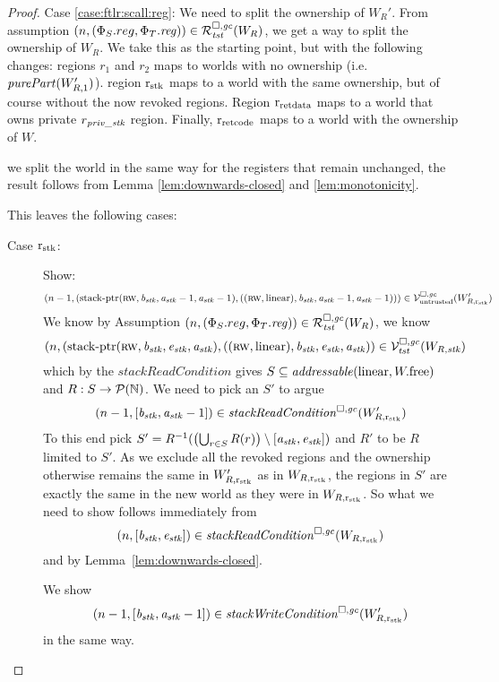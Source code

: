 \begin{proof}
  Case \ref{case:ftlr:scall:reg}: We need to split the ownership of $W_R'$.
  From assumption $\npair[n]{(\Phi_S.reg,\Phi_T.\reg)} \in \lrrg{\trust}(W_R)$, we get a way to split the ownership of $W_R$.
  We take this as the starting point, but with the following changes: regions $r_1$ and $r_2$ maps to worlds with no ownership (i.e.\ $\purePart{W_{R,1}'}$).
  region $\rstk$ maps to a world with the same ownership, but of course without the now revoked regions.
  Region $\rretd$ maps to a world that owns private $r_\var{priv\_stk}$ region.
  Finally, $\rretc$ maps to a world with the ownership of $W$.

  we split the world in the same way for the registers that remain unchanged, the
  result follows from Lemma \ref{lem:downwards-closed} and \ref{lem:monotonicity}.

  This leaves the following cases:
  \begin{description}
  \item[Case $\rstk$:] Show:
    \[
      \npair[n-1]{(\stkptr{\rw,\baddr_\stk,\aaddr_\stk-1,\aaddr_\stk-1},((\rw,\linear),\baddr_\stk,\aaddr_\stk-1,\aaddr_\stk-1))} \in \lrv(W_{R,\rstk}')
    \]
    We know by Assumption $\npair[n]{(\Phi_S.reg,\Phi_T.\reg)} \in \lrrg{\trust}(W_R)$, we know
    \[
      \npair[n]{(\stkptr{\rw,\baddr_\stk,\eaddr_\stk,\aaddr_\stk},((\rw, \linear), \baddr_\stk ,\eaddr_\stk, \aaddr_\stk)} \in \lrvg{\trust}(W_{R,\stk})
    \]
    which by the $\mathit{stackReadCondition}$ gives $S \subseteq \addressable{\linear,\pwfree}$ and $R : S \fun \powerset{\nats}$.
    We need to pick an $S'$ to argue
    \[
      \npair[n-1]{[\baddr_\stk,\aaddr_\stk-1]} \in \stackReadCond{W_{R,\rstk}'}
    \]
    To this end pick $S' = R^{-1}(\left(\bigcup_{r\in S} R(r) \right) \setminus [\aaddr_\stk,\eaddr_\stk])$ and $R'$ to be $R$ limited to $S'$.
    As we exclude all the revoked regions and the ownership otherwise remains the
    same in $W_{R,\rstk}'$ as in $W_{R,\rstk}$, the regions in $S'$ are exactly the same in the new world as they were in $W_{R,\rstk}$.
    So what we need to show follows immediately from
    \[
      \npair[n]{[\baddr_\stk,\eaddr_\stk]} \in \stackReadCond{W_{R,\rstk}}
    \]
    and by Lemma~\ref{lem:downwards-closed}.

    We show
    \[
      \npair[n-1]{[\baddr_\stk,\aaddr_\stk-1]} \in \stackWriteCond{W_{R,\rstk}'}
    \]
    in the same way.


\end{description}
\end{proof}
